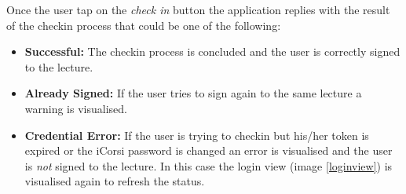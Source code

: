 Once the user tap on the \emph{check in} button the application replies with the result of the checkin process that could be one of the following:
\begin{itemize}
\item \textbf{Successful:} The checkin process is concluded and the user is correctly signed to the lecture.
\item \textbf{Already Signed:} If the user tries to sign again to the same lecture a warning is visualised.
\item \textbf{Credential Error:} If the user is trying to checkin but his/her token is expired or the iCorsi password is changed an error is visualised and the user is \emph{not} signed to the lecture. In this case the login view (image \ref{loginview}) is visualised again to refresh the status.
\end{itemize}


